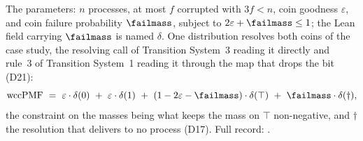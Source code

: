 \begin{definition}
  \label{def:aba-params}
  \leanok
  The parameters: $n$ processes, at most $f$ corrupted with $3f < n$, coin goodness $\varepsilon$, and coin failure probability $\failmass$, subject to $2\varepsilon + \failmass \le 1$; the Lean field carrying $\failmass$ is named $\delta$.
  One distribution resolves both coins of the case study, the resolving call  of Transition System~3 reading it directly and rule~3 of Transition System~1 reading it through the map that drops the bit (D21):
  \[
    \mathrm{wccPMF} \ =\ \varepsilon \cdot \delta(0) \ +\
      \varepsilon \cdot \delta(1) \ +\
      (1 - 2\varepsilon - \failmass) \cdot \delta(\top) \ +\
      \failmass \cdot \delta(\dagger),
  \]
  the constraint on the masses being what keeps the mass on $\top$ non-negative, and $\dagger$ the resolution that delivers to no process (D17).
  Full record: .
\end{definition}
